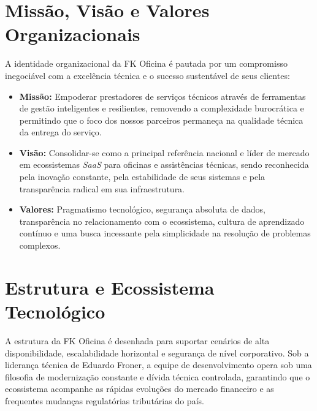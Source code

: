 \section{Missão, Visão e Valores Organizacionais}
\label{sec:missao-visao-valores}

A identidade organizacional da FK Oficina é pautada por um compromisso inegociável com a excelência técnica e o sucesso sustentável de seus clientes:

\begin{itemize}
    \item \textbf{Missão:} Empoderar prestadores de serviços técnicos através de ferramentas de gestão inteligentes e resilientes, removendo a complexidade burocrática e permitindo que o foco dos nossos parceiros permaneça na qualidade técnica da entrega do serviço.
    \item \textbf{Visão:} Consolidar-se como a principal referência nacional e líder de mercado em ecossistemas \textit{SaaS} para oficinas e assistências técnicas, sendo reconhecida pela inovação constante, pela estabilidade de seus sistemas e pela transparência radical em sua infraestrutura.
    \item \textbf{Valores:} Pragmatismo tecnológico, segurança absoluta de dados, transparência no relacionamento com o ecossistema, cultura de aprendizado contínuo e uma busca incessante pela simplicidade na resolução de problemas complexos.
\end{itemize}

\section{Estrutura e Ecossistema Tecnológico}
\label{sec:estrutura-tecnologica}

A estrutura da FK Oficina é desenhada para suportar cenários de alta disponibilidade, escalabilidade horizontal e segurança de nível corporativo. Sob a liderança técnica de Eduardo Froner, a equipe de desenvolvimento opera sob uma filosofia de modernização constante e dívida técnica controlada, garantindo que o ecossistema acompanhe as rápidas evoluções do mercado financeiro e as frequentes mudanças regulatórias tributárias do país.

